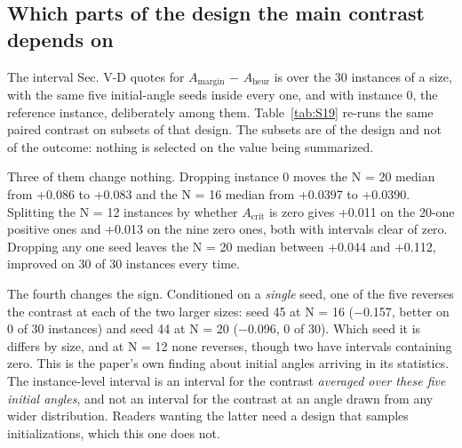\documentclass[journal]{IEEEtran}
\begin{document}
\begin{table}[!t]
\end{table}


\subsection{Which parts of the design the main contrast depends on}


The interval Sec. V-D quotes for $A_{\mathrm{margin}}$ $-$ $A_{\mathrm{heur}}$ is over the 30 instances of a size, with the same five initial-angle seeds inside every one, and with instance 0, the reference instance, deliberately among them. Table~\ref{tab:S19} re-runs the same paired contrast on subsets of that design. The subsets are of the design and not of the outcome: nothing is selected on the value being summarized.


Three of them change nothing. Dropping instance 0 moves the N = 20 median from +0.086 to +0.083 and the N = 16 median from +0.0397 to +0.0390. Splitting the N = 12 instances by whether $A_{\mathrm{crit}}$ is zero gives +0.011 on the 20-one positive ones and +0.013 on the nine zero ones, both with intervals clear of zero. Dropping any one seed leaves the N = 20 median between +0.044 and +0.112, improved on 30 of 30 instances every time.


The fourth changes the sign. Conditioned on a \textit{single} seed, one of the five reverses the contrast at each of the two larger sizes: seed 45 at N = 16 ($-$0.157, better on 0 of 30 instances) and seed 44 at N = 20 ($-$0.096, 0 of 30). Which seed it is differs by size, and at N = 12 none reverses, though two have intervals containing zero. This is the paper's own finding about initial angles arriving in its statistics. The instance-level interval is an interval for the contrast \textit{averaged over these five initial angles}, and not an interval for the contrast at an angle drawn from any wider distribution. Readers wanting the latter need a design that samples initializations, which this one does not.
\end{document}
